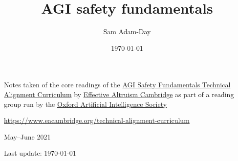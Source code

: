 \documentclass[a4paper]{report}
\title{AGI safety fundamentals}
\author{Sam Adam-Day}
\date{\today}
\begin{document}
	\makeatletter
	\begin{titlepage}
		\begin{center}

			\vspace*{1cm}
			
			\Huge
			\textbf{\@title}

			\vspace*{1cm}

			\LARGE
			Notes taken of the core readings of the \href{https://www.eacambridge.org/technical-alignment-curriculum}{AGI Safety Fundamentals Technical Alignment Curriculum} by \href{https://www.eacambridge.org/}{Effective Altruism Cambridge} as part of a reading group run by the \href{https://oxai.org/}{Oxford Artificial Intelligence Society}

			\vspace*{0.5cm}

			\url{https://www.eacambridge.org/technical-alignment-curriculum}

			\vfill

			\Large
			\@author

			\vspace*{0.5cm}

			\Large
			May--June 2021

			\vspace*{0.5cm}

			Last update: \today

		\end{center}
	\end{titlepage}
	\makeatother

	\setcounter{tocdepth}{1}
	\tableofcontents

    
	
	
	
	
	
	

	\printbibliography
\end{document}
